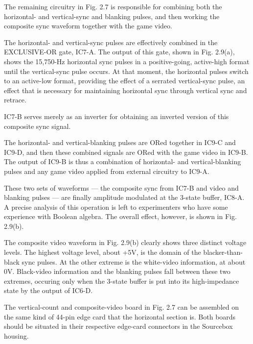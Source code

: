 \documentclass[11pt]{book}              %
\begin{document}
The remaining circuitry in Fig. 2.7 is responsible for combining both the horizontal- and vertical-sync and blanking pulses, and then working the composite sync waveform together with the game video.

The horizontal- and vertical-sync pulses are effectively combined in the EXCLUSIVE-OR gate, IC7-A. The output of this gate, shown in Fig. 2.9(a), shows the 15,750-Hz horizontal sync pulses in a positive-going, active-high format until the vertical-sync pulse occurs. At that moment, the horizontal pulses switch to an active-low format, providing the effect of a serrated vertical-sync pulse, an effect that is necessary for maintaining horizontal sync through vertical sync and retrace.

IC7-B serves merely as an inverter for obtaining an inverted version of this composite sync signal.

The horizontal- and vertical-blanking pulses are ORed together in IC9-C and IC9-D, and then these combined signals are ORed with the game video in IC9-B. The output of IC9-B is thus a combination of horizontal- and vertical-blanking pulses and any game video applied from external circuitry to IC9-A.

These two sets of waveforms — the composite sync from IC7-B and video and blanking pulses — are finally amplitude modulated at the 3-state buffer, IC8-A. A precise analysis of this operation is left to experimenters who have some experience with Boolean algebra. The overall effect, however, is shown in Fig. 2.9(b).

The composite video waveform in Fig. 2.9(b) clearly shows three distinct voltage levels. The highest voltage level, about +5V, is the domain of the blacker-than-black sync pulses. At the other extreme is the white-video information, at about 0V. Black-video information and the blanking pulses fall between these two extremes, occuring only when the 3-state buffer is put into its high-impedance state by the output of IC6-D.

The vertical-count and composite-video board in Fig. 2.7 can be assembled on the same kind of 44-pin edge card that the horizontal section is. Both boards should be situated in their respective edge-card connectors in the Sourcebox housing.
\end{document}
